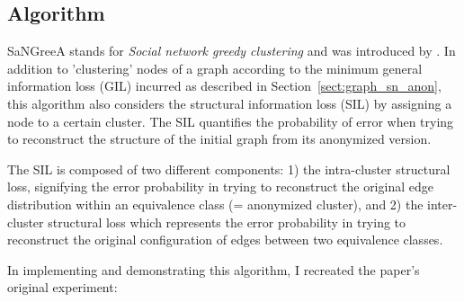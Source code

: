 \documentclass{llncs}
\begin{document}
\subsection{Algorithm}
\label{ssect:algorithm}


SaNGreeA stands for \textit{Social network greedy clustering} and was introduced by \cite{campan2009data}. In addition to 'clustering' nodes of a graph according to the minimum general information loss (GIL) incurred as described in Section~\ref{sect:graph_sn_anon}, this algorithm also considers the structural information loss (SIL) by assigning a node to a certain cluster. The SIL quantifies the probability of error when trying to reconstruct the structure of the initial graph from its anonymized version.

The SIL is composed of two different components: 1) the intra-cluster structural loss, signifying the error probability in trying to reconstruct the original edge distribution within an equivalence class (= anonymized cluster), and 2) the inter-cluster structural loss which represents the error probability in trying to reconstruct the original configuration of edges between two equivalence classes.

In implementing and demonstrating this algorithm, I recreated the paper's original experiment:
\end{document}
